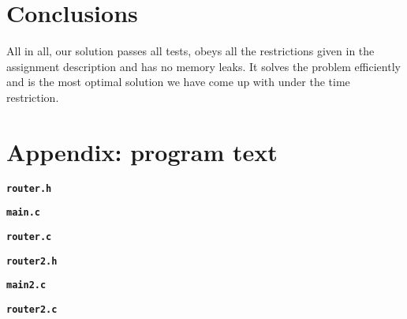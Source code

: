 \documentclass{lpm/adsrprt}
\begin{document}
\section{Conclusions}

All in all, our solution passes all tests, obeys all the restrictions given in the assignment description and has no memory leaks. It solves the problem efficiently and is the most optimal solution we have come up with under the time restriction.

\section{Appendix: program text}

\texttt{\bfseries router.h}


\texttt{\bfseries main.c}


\texttt{\bfseries router.c}


\texttt{\bfseries router2.h}


\texttt{\bfseries main2.c}


\texttt{\bfseries router2.c}



%

%
\end{document}

